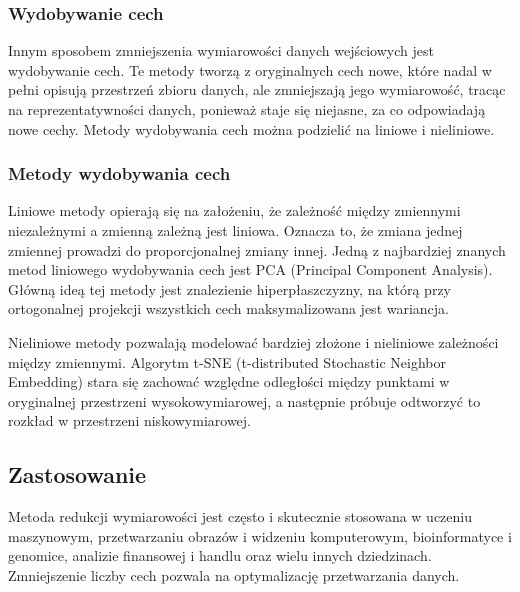 		\subsubsection{Wydobywanie cech}	
			Innym sposobem zmniejszenia wymiarowości danych wejściowych jest wydobywanie cech. Te metody tworzą z oryginalnych cech nowe, które nadal w pełni opisują przestrzeń zbioru danych, ale zmniejszają jego wymiarowość, tracąc na reprezentatywności danych, ponieważ staje się niejasne, za co odpowiadają nowe cechy. Metody wydobywania cech można podzielić na liniowe i nieliniowe.

		\subsubsection{Metody wydobywania cech}
			Liniowe metody opierają się na założeniu, że zależność między zmiennymi niezależnymi a zmienną zależną jest liniowa. Oznacza to, że zmiana jednej zmiennej prowadzi do proporcjonalnej zmiany innej. Jedną z najbardziej znanych metod liniowego wydobywania cech jest PCA (Principal Component Analysis). Główną ideą tej metody jest znalezienie hiperpłaszczyzny, na którą przy ortogonalnej projekcji wszystkich cech maksymalizowana jest wariancja.
		
			Nieliniowe metody pozwalają modelować bardziej złożone i nieliniowe zależności między zmiennymi. Algorytm t-SNE (t-distributed Stochastic Neighbor Embedding) stara się zachować względne odległości między punktami w oryginalnej przestrzeni wysokowymiarowej, a następnie próbuje odtworzyć to rozkład w przestrzeni niskowymiarowej.

	\subsection{Zastosowanie}
		Metoda redukcji wymiarowości jest często i skutecznie stosowana w uczeniu maszynowym, przetwarzaniu obrazów i widzeniu komputerowym, bioinformatyce i genomice, analizie finansowej i handlu oraz wielu innych dziedzinach. Zmniejszenie liczby cech pozwala na optymalizację przetwarzania danych.



